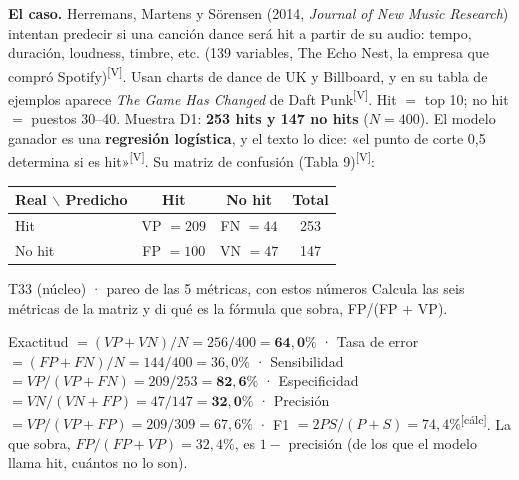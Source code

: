 \documentclass[10pt,a4paper]{article}
\newcommand{\V}{\textsuperscript{\textcolor{green!45!black}{[V]}}}
\newcommand{\calc}{\textsuperscript{\textcolor{blue!60!black}{[cálc]}}}
\begin{document}
\textbf{El caso.} Herremans, Martens y Sörensen (2014, \emph{Journal of New Music Research}) intentan predecir si una canción dance será hit a partir de su audio: tempo, duración, loudness, timbre, etc. (139 variables, The Echo Nest, la empresa que compró Spotify)\V. Usan charts de dance de UK y Billboard, y en su tabla de ejemplos aparece \emph{The Game Has Changed} de Daft Punk\V. Hit $=$ top 10; no hit $=$ puestos 30--40. Muestra D1: \textbf{253 hits y 147 no hits} ($N=400$). El modelo ganador es una \textbf{regresión logística}, y el texto lo dice: «el punto de corte 0,5 determina si es hit»\V. Su matriz de confusión (Tabla 9)\V:
\begin{center}\small
\begin{tabular}{lcc|c}\toprule
Real $\backslash$ Predicho & Hit & No hit & Total\\\midrule
Hit & VP $=209$ & FN $=44$ & 253\\
No hit & FP $=100$ & VN $=47$ & 147\\\bottomrule
\end{tabular}
\end{center}

\begin{enun}{T33 (núcleo) · pareo de las 5 métricas, con estos números}
Calcula las seis métricas de la matriz y di qué es la fórmula que sobra, FP/(FP + VP).
\end{enun}
\begin{ejemplar}
Exactitud $=(VP+VN)/N=256/400=\mathbf{64{,}0\%}$ · Tasa de error $=(FP+FN)/N=144/400=36{,}0\%$ · Sensibilidad $=VP/(VP+FN)=209/253=\mathbf{82{,}6\%}$ · Especificidad $=VN/(VN+FP)=47/147=\mathbf{32{,}0\%}$ · Precisión $=VP/(VP+FP)=209/309=67{,}6\%$ · F1 $=2PS/(P+S)=74{,}4\%$\calc. La que sobra, $FP/(FP+VP)=32{,}4\%$, es $1-$ precisión (de los que el modelo llama hit, cuántos no lo son).
\end{ejemplar}
\end{document}

